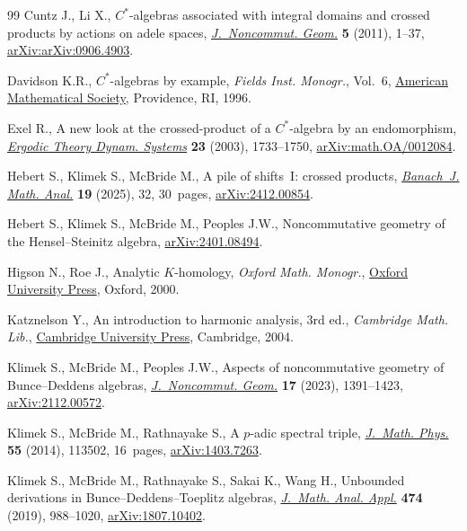 \documentclass[10pt,a4paper]{amsart}
\numberwithin{equation}{section}
\begin{document}
\begin{thebibliography}{99}
Cuntz J., Li X., {$C^\ast$}-algebras associated with integral domains and
 crossed products by actions on adele spaces,
 \href{https://doi.org/10.4171/JNCG/68}{\textit{J.~Noncommut. Geom.}}
 \textbf{5} (2011), 1--37,
 \href{http://arxiv.org/abs/arXiv:0906.4903}{arXiv:arXiv:0906.4903}.

Davidson K.R., {$C^*$}-algebras by example, \textit{Fields Inst. Monogr.},
 Vol.~6, \href{https://doi.org/10.1090/fim/006}{American Mathematical Society},
 Providence, RI, 1996.

Exel R., A new look at the crossed-product of a {$C^*$}-algebra by an
 endomorphism,
 \href{https://doi.org/10.1017/S0143385702001797}{\textit{Ergodic Theory
 Dynam. Systems}} \textbf{23} (2003), 1733--1750,
 \href{http://arxiv.org/abs/math.OA/0012084}{arXiv:math.OA/0012084}.

Hebert S., Klimek S., McBride M., A pile of shifts~{I}: crossed products,
 \href{https://doi.org/10.1007/s43037-025-00425-6}{\textit{Banach~J. Math.
 Anal.}} \textbf{19} (2025), 32, 30~pages,
 \href{http://arxiv.org/abs/2412.00854}{arXiv:2412.00854}.

Hebert S., Klimek S., McBride M., Peoples J.W., Noncommutative geometry of the
 {H}ensel--{S}teinitz algebra,
 \href{http://arxiv.org/abs/2401.08494}{arXiv:2401.08494}.

Higson N., Roe J., Analytic {$K$}-homology, \textit{Oxford Math. Monogr.},
 \href{https://doi.org/10.1093/oso/9780198511762.001.0001}{Oxford University
 Press}, Oxford, 2000.

Katznelson Y., An introduction to harmonic analysis, 3rd ed., \textit{Cambridge Math. Lib.}, \href{https://doi.org/10.1017/CBO9781139165372}{Cambridge University
 Press}, Cambridge, 2004.

Klimek S., McBride M., Peoples J.W., Aspects of noncommutative geometry of
 {B}unce--{D}eddens algebras,
 \href{https://doi.org/10.4171/jncg/521}{\textit{J.~Noncommut. Geom.}}
 \textbf{17} (2023), 1391--1423,
 \href{http://arxiv.org/abs/2112.00572}{arXiv:2112.00572}.

Klimek S., McBride M., Rathnayake S., A {$p$}-adic spectral triple,
 \href{https://doi.org/10.1063/1.4900923}{\textit{J.~Math. Phys.}} \textbf{55}
 (2014), 113502, 16~pages,
 \href{http://arxiv.org/abs/1403.7263}{arXiv:1403.7263}.

Klimek S., McBride M., Rathnayake S., Sakai K., Wang H., Unbounded derivations
 in {B}unce--{D}eddens--{T}oeplitz algebras,
 \href{https://doi.org/10.1016/j.jmaa.2019.02.001}{\textit{J.~Math. Anal.
 Appl.}} \textbf{474} (2019), 988--1020,
 \href{http://arxiv.org/abs/1807.10402}{arXiv:1807.10402}.


\end{thebibliography}
\end{document}
